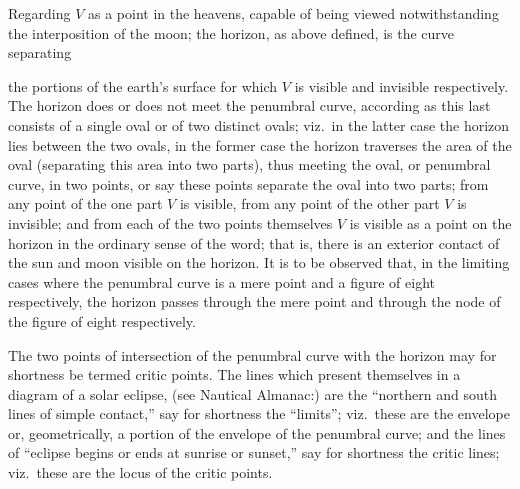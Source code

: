 \documentclass[11pt,a4paper]{article}
\begin{document}
\medskip

Regarding $V$ as a point in the heavens, capable of being viewed notwithstanding the interposition of the moon; the horizon, as above defined, is the curve separating

\newpage


\noindent the portions of the earth's surface for which $V$ is visible and invisible respectively. The horizon does or does not meet the penumbral curve, according as this last consists of a single oval or of two distinct ovals; viz.\ in the latter case the horizon lies between the two ovals, in the former case the horizon traverses the area of the oval (separating this area into two parts), thus meeting the oval, or penumbral curve, in two points, or say these points separate the oval into two parts; from any point of the one part $V$ is visible, from any point of the other part $V$ is invisible; and from each of the two points themselves $V$ is visible as a point on the horizon in the ordinary sense of the word; that is, there is an exterior contact of the sun and moon visible on the horizon. It is to be observed that, in the limiting cases where the penumbral curve is a mere point and a figure of eight respectively, the horizon passes through the mere point and through the node of the figure of eight respectively.

\medskip

The two points of intersection of the penumbral curve with the horizon may for shortness be termed critic points. The lines which present themselves in a diagram of a solar eclipse, (see Nautical Almanac:) are the ``northern and south lines of simple contact,'' say for shortness the ``limits''; viz.\ these are the envelope or, geometrically, a portion of the envelope of the penumbral curve; and the lines of ``eclipse begins or ends at sunrise or sunset,'' say for shortness the critic lines; viz.\ these are the locus of the critic points.

\medskip
\end{document}
